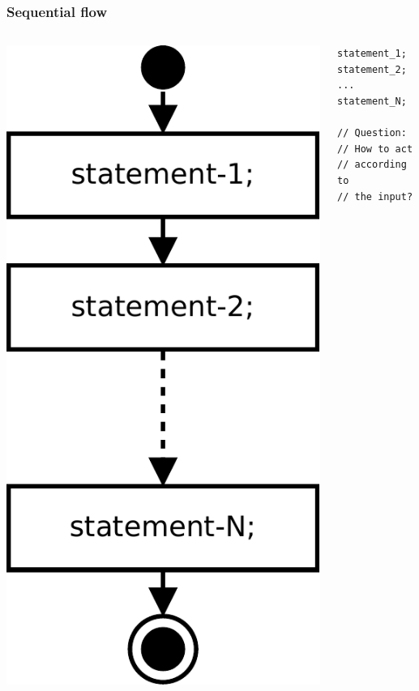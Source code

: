 \begin{frame}[fragile]
\frametitle{Sequential flow}
\begin{columns}[c]
  \begin{column}{0.5\textwidth}
  \hfill
\includegraphics[scale=0.5]{figures/flow}
  \end{column}
  \begin{column}{0.5\textwidth}
\begin{lstlisting}
statement_1;
statement_2;
...
statement_N;

// Question:
// How to act
// according to
// the input?
\end{lstlisting}
  \end{column}
\end{columns}
\end{frame}

